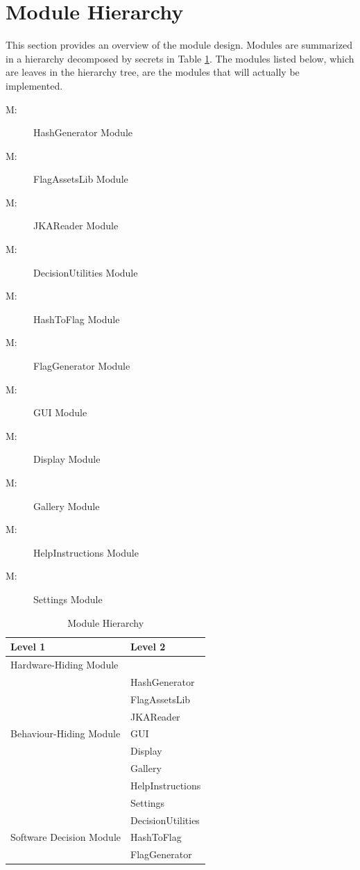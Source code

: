\documentclass[12pt, titlepage]{article}
\newcounter{mnum}
\newcommand{\mthemnum}{M\themnum}
\begin{document}
\section{Module Hierarchy} \label{SecMH}

This section provides an overview of the module design. Modules are summarized
in a hierarchy decomposed by secrets in Table \ref{TblMH}. The modules listed
below, which are leaves in the hierarchy tree, are the modules that will
actually be implemented.

\begin{description}
\item [ \mthemnum \label{M1}:] HashGenerator Module
\item [ \mthemnum \label{M2}:] FlagAssetsLib Module
\item [ \mthemnum \label{M3}:] JKAReader Module
\item [ \mthemnum \label{M4}:] DecisionUtilities Module
\item [ \mthemnum \label{M5}:] HashToFlag Module
\item [ \mthemnum \label{M6}:] FlagGenerator Module
\item [ \mthemnum \label{M7}:] GUI Module
\item [ \mthemnum \label{M8}:] Display Module
\item [ \mthemnum \label{M9}:] Gallery Module
\item [ \mthemnum \label{M10}:] HelpInstructions Module
\item [ \mthemnum \label{M11}:] Settings Module
\end{description}


\begin{table}[h!]
\centering
\begin{tabular}{p{} p{}}
\toprule
\textbf{Level 1} & \textbf{Level 2}\\
\midrule

{Hardware-Hiding Module} & ~ \\
\midrule

\multirow{7}{0.3\textwidth}{Behaviour-Hiding Module} & HashGenerator \\
& FlagAssetsLib \\
& JKAReader \\
& GUI \\
& Display \\
& Gallery \\ 
& HelpInstructions \\
& Settings \\
\midrule

\multirow{3}{0.3\textwidth}{Software Decision Module} & DecisionUtilities \\
& HashToFlag \\
& FlagGenerator \\
\bottomrule

\end{tabular}
\caption{Module Hierarchy}
\label{TblMH}
\end{table}
\end{document}
